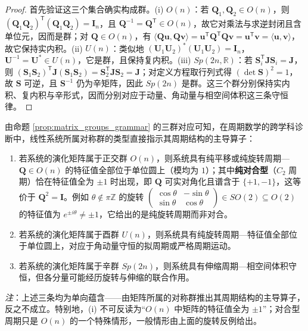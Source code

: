 \begin{proof}
首先验证这三个集合确实构成群。(i) $O(n)$：若 $\mathbf{Q}_1, \mathbf{Q}_2 \in O(n)$，则 $(\mathbf{Q}_1\mathbf{Q}_2)^{\mathsf T}(\mathbf{Q}_1\mathbf{Q}_2) = \mathbf{I}_n$，且 $\mathbf{Q}^{-1} = \mathbf{Q}^{\mathsf T} \in O(n)$，故它对乘法与求逆封闭且含单位元，因而是群；对 $\mathbf{Q} \in O(n)$，有 $\langle \mathbf{Q}\mathbf{u}, \mathbf{Q}\mathbf{v} \rangle = \mathbf{u}^{\mathsf T}\mathbf{Q}^{\mathsf T}\mathbf{Q}\mathbf{v} = \mathbf{u}^{\mathsf T}\mathbf{v} = \langle \mathbf{u}, \mathbf{v} \rangle$，故它保持实内积。(ii) $U(n)$：类似地 $(\mathbf{U}_1\mathbf{U}_2)^*(\mathbf{U}_1\mathbf{U}_2) = \mathbf{I}_n$，$\mathbf{U}^{-1} = \mathbf{U}^* \in U(n)$，它是群，且保持复内积。(iii) $Sp(2n,\mathbb{R})$：若 $\mathbf{S}_i^{\mathsf T}\mathbf{J}\mathbf{S}_i = \mathbf{J}$，则 $(\mathbf{S}_1\mathbf{S}_2)^{\mathsf T}\mathbf{J}(\mathbf{S}_1\mathbf{S}_2) = \mathbf{S}_2^{\mathsf T}\mathbf{J}\mathbf{S}_2 = \mathbf{J}$；对定义方程取行列式得 $(\det\mathbf{S})^2 = 1$，故 $\mathbf{S}$ 可逆，且 $\mathbf{S}^{-1}$ 仍为辛矩阵，因此 $Sp(2n)$ 是群。这三个群分别保持实内积、复内积与辛形式，因而分别对应于动量、角动量与相空间体积这三条守恒律。
\end{proof}

\begin{corollary}[矩阵群的周期诊断意义]\label{cor:matrix_group_diagnosis}
由命题 \ref{prop:matrix_groups_grammar} 的三群对应可知，在周期数学的跨学科诊断中，线性系统所属对称群的类型直接指示其周期结构的主导算子：
\begin{enumerate}[label=(\roman*)]
    \item 若系统的演化矩阵属于正交群 $O(n)$，则系统具有纯平移或纯旋转周期---$\mathbf{Q}\in O(n)$ 的特征值全部位于单位圆上（模均为 $1$）；其中\textbf{纯对合型}（$C_2$ 周期）恰在特征值全为 $\pm 1$ 时出现，即 $\mathbf{Q}$ 可实对角化且谱含于 $\{+1,-1\}$，这等价于 $\mathbf{Q}^2=\mathbf{I}$。例如 $\theta\notin\pi\mathbb{Z}$ 的旋转 $\begin{pmatrix}\cos\theta&-\sin\theta\\ \sin\theta&\cos\theta\end{pmatrix}\in SO(2)\subseteq O(2)$ 的特征值为 $e^{\pm i\theta}\neq\pm1$，它给出的是纯旋转周期而非对合。
    \item 若系统的演化矩阵属于酉群 $U(n)$，则系统具有纯旋转周期---特征值全部位于单位圆上，对应于角动量守恒的拟周期或严格周期运动。
    \item 若系统的演化矩阵属于辛群 $Sp(2n)$，则系统具有伸缩周期---相空间体积守恒，但各分量可能经历旋转与伸缩的联合作用。
\end{enumerate}
\emph{注}：上述三条均为单向蕴含——由矩阵所属的对称群推出其周期结构的主导算子，反之不成立。特别地，(i) 不可反读为“$O(n)$ 中矩阵的特征值全为 $\pm 1$”；对合型周期只是 $O(n)$ 的一个特殊情形，一般情形由上面的旋转反例给出。
\end{corollary}


